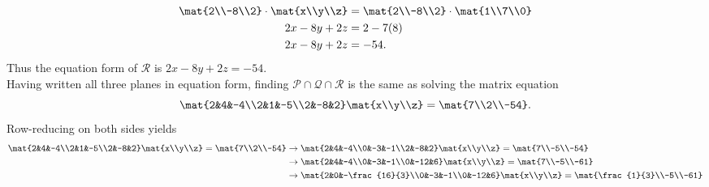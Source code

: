 \begin{exercises}
\begin{problist}
\begin{solution}
			\begin{align*}
				\mat{2\\-8\\2}\cdot \mat{x\\y\\z}&=\mat{2\\-8\\2}\cdot\mat{1\\7\\0}\\
				2x-8y+2z&=2-7(8)\\
				2x-8y+2z&=-54.
			\end{align*}
			Thus the equation form of $\mathcal{R}$ is $2x-8y+2z=-54$.\\
			Having written all three planes in equation form, finding $\mathcal{P}\cap\mathcal{Q}\cap\mathcal{R}$ is the same as 
			solving the matrix equation \[\mat{2&4&-4\\2&1&-5\\2&-8&2}\mat{x\\y\\z}=\mat{7\\2\\-54}.\] Row-reducing on both sides yields 
			\begin{align*}
				\mat{2&4&-4\\2&1&-5\\2&-8&2}\mat{x\\y\\z}=\mat{7\\2\\-54}&\rightarrow \mat{2&4&-4\\0&-3&-1\\2&-8&2}\mat{x\\y\\z}=\mat{7\\-5\\-54}\\
				&\rightarrow \mat{2&4&-4\\0&-3&-1\\0&-12&6}\mat{x\\y\\z}=\mat{7\\-5\\-61}\\
				&\rightarrow \mat{2&0&-\frac{16}{3}\\0&-3&-1\\0&-12&6}\mat{x\\y\\z}=\mat{\frac{1}{3}\\-5\\-61}\\

\end{align*}
\end{solution}
\end{problist}
\end{exercises}
